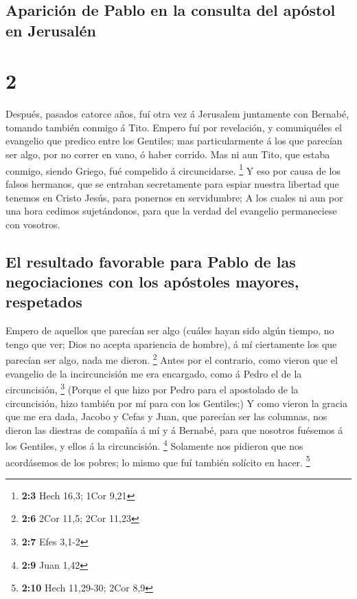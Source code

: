 \hypertarget{apariciuxf3n-de-pablo-en-la-consulta-del-apuxf3stol-en-jerusaluxe9n}{%
\subsection{Aparición de Pablo en la consulta del apóstol en
Jerusalén}\label{apariciuxf3n-de-pablo-en-la-consulta-del-apuxf3stol-en-jerusaluxe9n}}

\hypertarget{section-1}{%
\section{2}\label{section-1}}

 Después, pasados catorce años, fuí otra vez á Jerusalem
juntamente con Bernabé, tomando también conmigo á Tito. 
Empero fuí por revelación, y comuniquéles el evangelio que predico entre
los Gentiles; mas particularmente á los que parecían ser algo, por no
correr en vano, ó haber corrido.  Mas ni aun Tito, que
estaba conmigo, siendo Griego, fué compelido á circuncidarse.
\footnote{\textbf{2:3} Hech 16,3; 1Cor 9,21}  Y eso por
causa de los falsos hermanos, que se entraban secretamente para espiar
nuestra libertad que tenemos en Cristo Jesús, para ponernos en
servidumbre;  A los cuales ni aun por una hora cedimos
sujetándonos, para que la verdad del evangelio permaneciese con
vosotros.

\hypertarget{el-resultado-favorable-para-pablo-de-las-negociaciones-con-los-apuxf3stoles-mayores-respetados}{%
\subsection{El resultado favorable para Pablo de las negociaciones con
los apóstoles mayores,
respetados}\label{el-resultado-favorable-para-pablo-de-las-negociaciones-con-los-apuxf3stoles-mayores-respetados}}

 Empero de aquellos que parecían ser algo (cuáles hayan sido
algún tiempo, no tengo que ver; Dios no acepta apariencia de hombre), á
mí ciertamente los que parecían ser algo, nada me dieron. \footnote{\textbf{2:6}
  2Cor 11,5; 2Cor 11,23}  Antes por el contrario, como
vieron que el evangelio de la incircuncisión me era encargado, como á
Pedro el de la circuncisión, \footnote{\textbf{2:7} Efes 3,1-2}
 (Porque el que hizo por Pedro para el apostolado de la
circuncisión, hizo también por mí para con los Gentiles;)  Y
como vieron la gracia que me era dada, Jacobo y Cefas y Juan, que
parecían ser las columnas, nos dieron las diestras de compañía á mí y á
Bernabé, para que nosotros fuésemos á los Gentiles, y ellos á la
circuncisión. \footnote{\textbf{2:9} Juan 1,42}  Solamente
nos pidieron que nos acordásemos de los pobres; lo mismo que fuí también
solícito en hacer. \footnote{\textbf{2:10} Hech 11,29-30; 2Cor 8,9}

